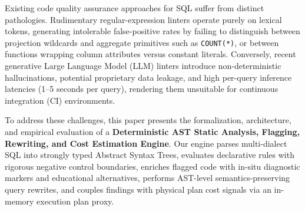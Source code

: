 \documentclass[conference]{IEEEtran}
\begin{document}
Existing code quality assurance approaches for SQL suffer from distinct pathologies. Rudimentary regular-expression linters operate purely on lexical tokens, generating intolerable false-positive rates by failing to distinguish between projection wildcards and aggregate primitives such as \texttt{COUNT(*)}, or between functions wrapping column attributes versus constant literals. Conversely, recent generative Large Language Model (LLM) linters introduce non-deterministic hallucinations, potential proprietary data leakage, and high per-query inference latencies (1--5 seconds per query), rendering them unsuitable for continuous integration (CI) environments.

To address these challenges, this paper presents the formalization, architecture, and empirical evaluation of a \textbf{Deterministic AST Static Analysis, Flagging, Rewriting, and Cost Estimation Engine}. Our engine parses multi-dialect SQL into strongly typed Abstract Syntax Trees, evaluates declarative rules with rigorous negative control boundaries, enriches flagged code with in-situ diagnostic markers and educational alternatives, performs AST-level semantics-preserving query rewrites, and couples findings with physical plan cost signals via an in-memory execution plan proxy.
\end{document}
